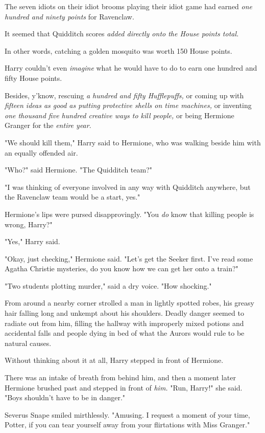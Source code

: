 The seven idiots on their idiot brooms playing their idiot game had earned
\emph{one hundred and ninety points} for Ravenclaw.

It seemed that Quidditch scores \emph{added directly onto the House points
total.}

In other words, catching a golden mosquito was worth 150 House points.

Harry couldn't even \emph{imagine} what he would have to do to earn one hundred
and fifty House points.

Besides, y'know, rescuing \emph{a hundred and fifty Hufflepuffs,} or coming up
with \emph{fifteen ideas as good as putting protective shells on time
machines,} or inventing \emph{one thousand five hundred creative ways to kill
people,} or being Hermione Granger for the \emph{entire year}.

"We should kill them," Harry said to Hermione, who was walking beside him with
an equally offended air.

"Who?" said Hermione. "The Quidditch team?"

"I was thinking of everyone involved in any way with Quidditch anywhere, but
the Ravenclaw team would be a start, yes."

Hermione's lips were pursed disapprovingly. "You \emph{do} know that killing
people is wrong, Harry?"

"Yes," Harry said.

"Okay, just checking," Hermione said. "Let's get the Seeker first. I've read
some Agatha Christie mysteries, do you know how we can get her onto a train?"

"Two students plotting murder," said a dry voice. "How shocking."

From around a nearby corner strolled a man in lightly spotted robes, his greasy
hair falling long and unkempt about his shoulders. Deadly danger seemed to
radiate out from him, filling the hallway with improperly mixed potions and
accidental falls and people dying in bed of what the Aurors would rule to be
natural causes.

Without thinking about it at all, Harry stepped in front of Hermione.

There was an intake of breath from behind him, and then a moment later Hermione
brushed past and stepped in front of \emph{him.} "Run, Harry!" she said. "Boys
shouldn't have to be in danger."

Severus Snape smiled mirthlessly. "Amusing. I request a moment of your time,
Potter, if you can tear yourself away from your flirtations with Miss Granger."


